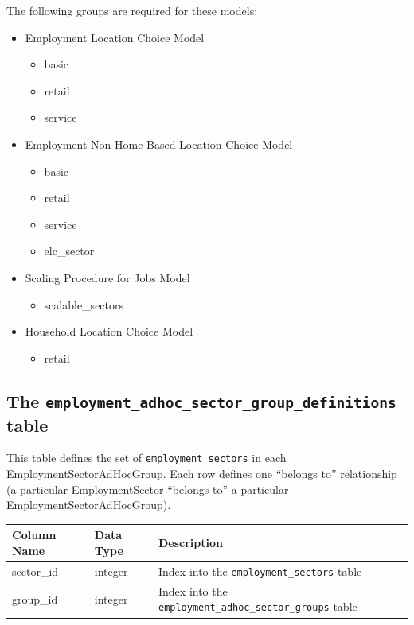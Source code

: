 The following groups are required for these models:
\begin{itemize} \tight
\item Employment Location Choice Model \modelsindex
\begin{itemize} \tight
\item basic
\item retail
\item service

\end{itemize}
\item Employment Non-Home-Based Location Choice Model \modelsindex
\begin{itemize} \tight
\item basic
\item retail
\item service
\item elc_sector

\end{itemize}
\item Scaling Procedure for Jobs Model \modelsindex
\begin{itemize} \tight
\item scalable_sectors

\end{itemize}
\item Household Location Choice Model \modelsindex
\begin{itemize} \tight
\item retail

\end{itemize}

\end{itemize}

\subsection{The {\tt employment_adhoc_sector_group_definitions} table}

This table defines the set of \verb|employment_sectors| in each
EmploymentSectorAdHocGroup. Each row defines one ``belongs to'' relationship (a
particular EmploymentSector ``belongs to'' a particular
EmploymentSectorAdHocGroup).

\begin{tabular}{|l|l|l|}
\hline
\textbf{Column Name} & \textbf{Data Type} & \textbf{Description} \\
\hline
sector_id & integer & Index into the \verb|employment_sectors| table  \\
\hline
group_id & integer & Index into the \verb|employment_adhoc_sector_groups| table  \\
\hline
\end{tabular}

